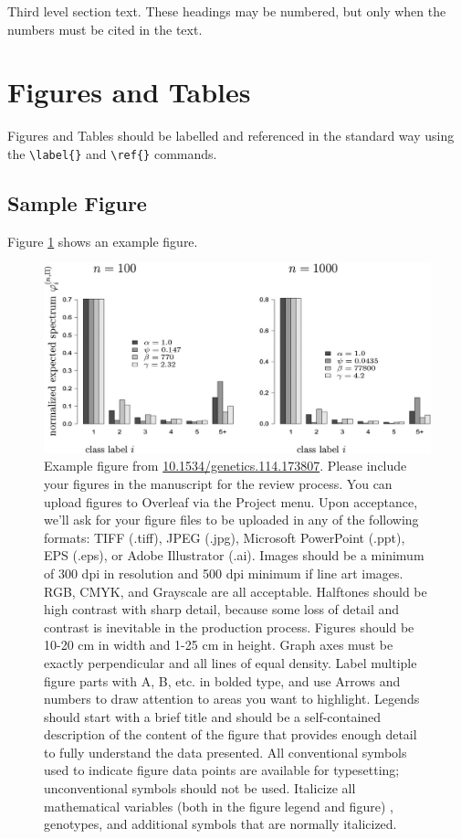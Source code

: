 \documentclass[9pt,twocolumn,twoside]{gsajnl}
\begin{document}
Third level section text. These headings may be numbered, but only when the numbers must be cited in the text. 

\section*{Figures and Tables}

Figures and Tables should be labelled and referenced in the standard way using the \verb|\label{}| and \verb|\ref{}| commands.

\subsection*{Sample Figure}

Figure \ref{fig:spectrum} shows an example figure.

\begin{figure}[htbp]
\centering
\includegraphics[width=\linewidth]{example-figure}
\caption{Example figure from \url{10.1534/genetics.114.173807}. Please include your figures in the manuscript for the review process. You can upload figures to Overleaf via the Project menu. Upon acceptance, we'll ask for your figure files to be uploaded in any of the following formats: TIFF (.tiff), JPEG (.jpg), Microsoft PowerPoint (.ppt), EPS (.eps), or Adobe Illustrator (.ai).  Images should be a minimum of 300 dpi in resolution and 500 dpi minimum if line art images.  RGB, CMYK, and Grayscale are all acceptable. Halftones should be high contrast with sharp detail, because some loss of detail and contrast is inevitable in the production process. Figures should be 10-20 cm in width and 1-25 cm in height. Graph axes must be exactly perpendicular and all lines of equal density.
Label multiple figure parts with A, B, etc. in bolded type, and use Arrows and numbers to draw attention to areas you want to highlight. Legends should start with a brief title and should be a self-contained description of the content of the figure that provides enough detail to fully understand the data presented. All conventional symbols used to indicate figure data points are available for typesetting; unconventional symbols should not be used. Italicize all mathematical variables (both in the figure legend and figure) , genotypes, and additional symbols that are normally italicized.  
}%
\label{fig:spectrum}
\end{figure}
\end{document}
